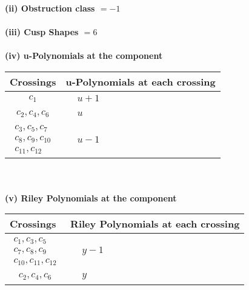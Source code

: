 \documentclass[1p]{elsarticle_modified}
\theoremstyle{definition}
\begin{document}
\flushleft \textbf{(ii) Obstruction class $= -1$}\\~\\
\flushleft \textbf{(iii) Cusp Shapes $= 6$}\\~\\
\newpage\renewcommand{\arraystretch}{1}
\flushleft \textbf{(iv) u-Polynomials at the component}\newline \\
\begin{tabular}{m{50pt}|m{274pt}}
Crossings & \hspace{64pt}u-Polynomials at each crossing \\
\hline $$\begin{aligned}c_{1}\end{aligned}$$&$\begin{aligned}
&u+1
\end{aligned}$\\
\hline $$\begin{aligned}c_{2},c_{4},c_{6}\end{aligned}$$&$\begin{aligned}
&u
\end{aligned}$\\
\hline $$\begin{aligned}c_{3},c_{5},c_{7}\\c_{8},c_{9},c_{10}\\c_{11},c_{12}\end{aligned}$$&$\begin{aligned}
&u-1
\end{aligned}$\\
\hline
\end{tabular}\\~\\
\newpage\renewcommand{\arraystretch}{1}
\flushleft \textbf{(v) Riley Polynomials at the component}\newline \\
\begin{tabular}{m{50pt}|m{274pt}}
Crossings & \hspace{64pt}Riley Polynomials at each crossing \\
\hline $$\begin{aligned}c_{1},c_{3},c_{5}\\c_{7},c_{8},c_{9}\\c_{10},c_{11},c_{12}\end{aligned}$$&$\begin{aligned}
&y-1
\end{aligned}$\\
\hline $$\begin{aligned}c_{2},c_{4},c_{6}\end{aligned}$$&$\begin{aligned}
&y
\end{aligned}$\\
\hline
\end{tabular}\\~\\
\end{document}
